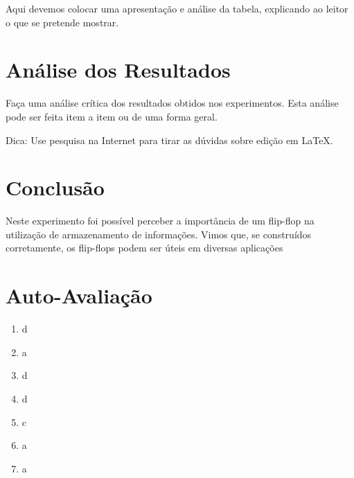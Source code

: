 \documentclass[12pt]{article}
\begin{document}
Aqui devemos colocar uma apresentação e análise da tabela, explicando ao leitor o que se pretende mostrar.

\section{Análise dos Resultados}
\label{sec:Resultados}

Faça uma análise crítica dos resultados obtidos nos experimentos. Esta análise pode ser feita item a item ou de uma forma geral.

Dica: Use pesquisa na Internet para tirar as dúvidas sobre edição em \LaTeX .

\section{Conclusão}
\label{sec:Conclusao}

Neste experimento foi possível perceber a importância de um flip-flop na utilização de armazenamento de informações. Vimos que, se construídos corretamente, os flip-flops podem ser úteis em diversas aplicações

\newpage 
\section*{Auto-Avaliação}

\begin{enumerate}
    \item d
    \item a
    \item d
    \item d
    \item c
    \item a
    \item a
\end{enumerate}
\end{document}
